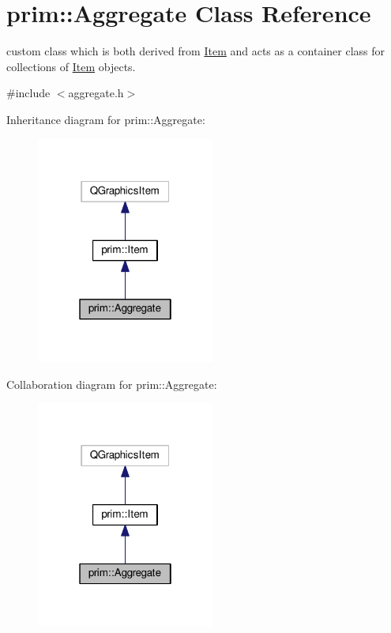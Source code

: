 \hypertarget{classprim_1_1Aggregate}{}\section{prim\+:\+:Aggregate Class Reference}
\label{classprim_1_1Aggregate}


custom class which is both derived from \hyperlink{classprim_1_1Item}{Item} and acts as a container class for collections of \hyperlink{classprim_1_1Item}{Item} objects.  




{\ttfamily \#include $<$aggregate.\+h$>$}



Inheritance diagram for prim\+:\+:Aggregate\+:\nopagebreak
\begin{figure}[H]
\begin{center}
\leavevmode
\includegraphics[width=166pt]{classprim_1_1Aggregate__inherit__graph}
\end{center}
\end{figure}


Collaboration diagram for prim\+:\+:Aggregate\+:\nopagebreak
\begin{figure}[H]
\begin{center}
\leavevmode
\includegraphics[width=166pt]{classprim_1_1Aggregate__coll__graph}
\end{center}
\end{figure}
